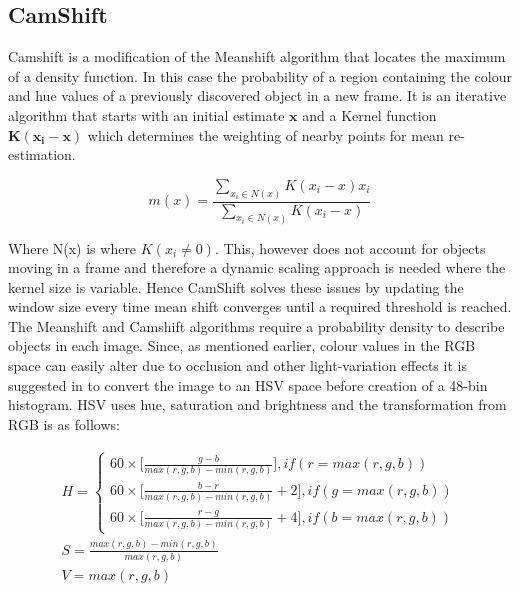 \documentclass[a4paper,11pt,notitlepage]{article}
\begin{document}
\subsection{CamShift}

Camshift is a modification of the Meanshift algorithm that locates the maximum of a density function. In this case the probability of a region containing the colour and hue values of a previously discovered object in a new frame. It is an iterative algorithm that starts with an initial estimate $\mathbf{x}$ and a Kernel function $\mathbf{K}(\mathbf{x_{i}} - \mathbf{x})$ which determines the weighting of nearby points for mean re-estimation.

\begin{equation}
m(x) = \frac{\sum_{x_{i} \in N(x)} K(x_{i} - x) x_{i}}{\sum_{x_{i} \in N(x)} K(x_{i} - x)}
\end{equation}

Where N(x) is where $K(x_{i} \neq 0)$. This, however does not account for objects moving in a frame and therefore a dynamic scaling approach is needed where the kernel size is variable. Hence CamShift \cite{Bradski98computervision} solves these issues by updating the window size every time mean shift converges until a required threshold is reached.
\newline \newline
The Meanshift and Camshift algorithms require a probability density to describe objects in each image. Since, as mentioned earlier, colour values in the RGB space can easily alter due to occlusion and other light-variation effects it is suggested in \cite{Ped_tract} to convert the image to an HSV space before creation of a 48-bin histogram. HSV uses hue, saturation and brightness and the transformation from RGB is as follows:

\begin{equation}
\begin{aligned}
H = 
\begin{cases}
    60 \times \Big[ \frac{g-b}{max(r,g,b)-min(r,g,b)} \Big] , if(r = max(r,g,b)) \\
    60 \times \Big[ \frac{b-r}{max(r,g,b)-min(r,g,b)} + 2 \Big] , if(g = max(r,g,b)) \\
    60 \times \Big[ \frac{r-g}{max(r,g,b)-min(r,g,b)} + 4 \Big] , if(b = max(r,g,b))
\end{cases} \\
S = \frac{max(r,g,b)-min(r,g,b)}{max(r,g,b)} \\
V = max(r,g,b)
\end{aligned}
\end{equation}
\end{document}
